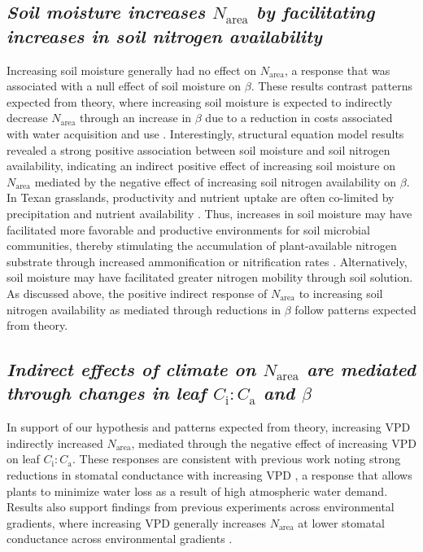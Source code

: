 \begin{singlespace}
\subsection{\textit{Soil moisture increases $N_\mathrm{area}$ by facilitating increases in soil nitrogen availability}}
\end{singlespace}
\noindent Increasing soil moisture generally had no effect on $N_\mathrm{area}$, a response that was associated with a null effect of soil moisture on $\beta$. These results contrast patterns expected from theory, where increasing soil moisture is expected to indirectly decrease $N_\mathrm{area}$ through an increase in $\beta$ due to a reduction in costs associated with water acquisition and use . Interestingly, structural equation model results revealed a strong positive association between soil moisture and soil nitrogen availability, indicating an indirect positive effect of increasing soil moisture on $N_\mathrm{area}$ mediated by the negative effect of increasing soil nitrogen availability on $\beta$. In Texan grasslands, productivity and nutrient uptake are often co-limited by precipitation and nutrient availability . Thus, increases in soil moisture may have facilitated more favorable and productive environments for soil microbial communities, thereby stimulating the accumulation of plant-available nitrogen substrate through increased ammonification or nitrification rates . Alternatively, soil moisture may have facilitated greater nitrogen mobility through soil solution. As discussed above, the positive indirect response of $N_\mathrm{area}$ to increasing soil nitrogen availability as mediated through reductions in $\beta$ follow patterns expected from theory.

\begin{singlespace}
\subsection{\textit{Indirect effects of climate on $N_\mathrm{area}$ are mediated through changes in leaf $C_\mathrm{i}\mathrm{:}C_\mathrm{a}$ and $\beta$}}
\end{singlespace}
\noindent In support of our hypothesis and patterns expected from theory, increasing VPD indirectly increased $N_\mathrm{area}$, mediated through the negative effect of increasing VPD on leaf $C_\mathrm{i}\mathrm{:}C_\mathrm{a}$. These responses are consistent with previous work noting strong reductions in stomatal conductance with increasing VPD , a response that allows plants to minimize water loss as a result of high atmospheric water demand. Results also support findings from previous experiments across environmental gradients, where increasing VPD generally increases $N_\mathrm{area}$ at lower stomatal conductance across environmental gradients .

